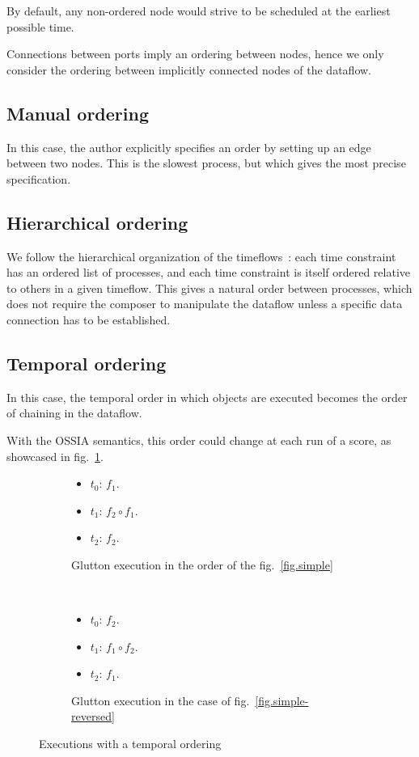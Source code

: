 \documentclass{article}
\begin{document}
By default, any non-ordered node would strive to be scheduled at the earliest possible time.
    
Connections between ports imply an ordering between nodes, hence we only consider the ordering between implicitly connected nodes of the dataflow.
    
\subsection{Manual ordering}
In this case, the author explicitly specifies an order by setting up an edge between two nodes. 
This is the slowest process, but which gives the most precise specification.
    
\subsection{Hierarchical ordering}
We follow the hierarchical organization of the timeflows~: each time constraint has an ordered list of processes, and each time constraint is itself ordered relative to others in a given timeflow. 
This gives a natural order between processes, which does not require the composer to manipulate the dataflow unless a specific data connection has to be established.
    
\subsection{Temporal ordering}
In this case, the temporal order in which objects are executed
becomes the order of chaining in the dataflow.

With the OSSIA semantics, this order could change at each run of a score, as showcased in fig.~\ref{fig.temporalordering}.
    
\begin{figure}[h]
  \begin{subfigure}{0.20\textwidth}
    \begin{itemize}
      \item $t_0$: $f_1$.
      \item $t_1$: $f_2 \circ f_1$.
      \item $t_2$: $f_2$. 
    \end{itemize}
    \caption{Glutton execution in the order of the fig.~\ref{fig.simple}}
  \end{subfigure}~
  \begin{subfigure}{0.20\textwidth}
    \begin{itemize}
      \item $t_0$: $f_2$.
      \item $t_1$: $f_1 \circ f_2$.
      \item $t_2$: $f_1$. 
    \end{itemize}
    \caption{Glutton execution in the case of fig.~\ref{fig.simple-reversed}}
  \end{subfigure}
  \caption{Executions with a temporal ordering}
  \label{fig.temporalordering}
\end{figure}
    
\end{document}
